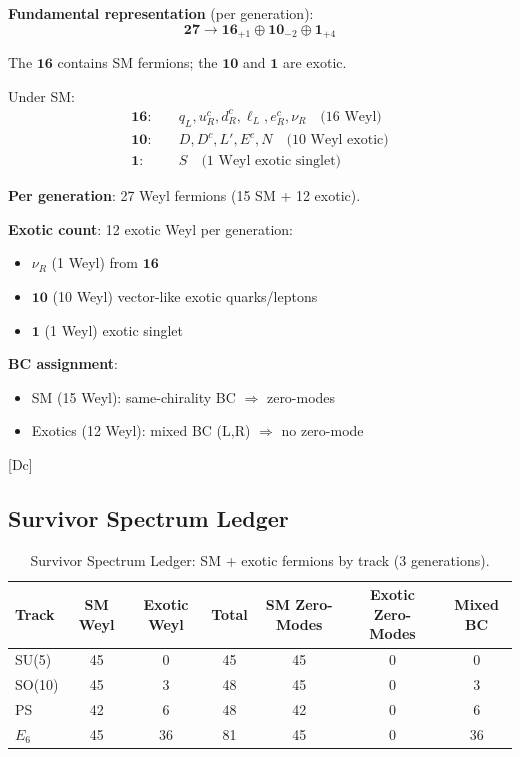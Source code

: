 \documentclass[11pt,a4paper]{article}
\newcommand{\tagDc}{\textcolor{blue!50!black}{[Dc]}}
\begin{document}
\begin{trackbox}
\textbf{Fundamental representation} (per generation):
\begin{equation}
\label{eq:e6-27}
\mathbf{27} \to \mathbf{16}_{+1} \oplus \mathbf{10}_{-2} \oplus \mathbf{1}_{+4}
\end{equation}

The $\mathbf{16}$ contains SM fermions; the $\mathbf{10}$ and $\mathbf{1}$ are exotic.

Under SM:
\begin{align}
\label{eq:e6-16-content}
\mathbf{16}: \quad & q_L, u_R^c, d_R^c, \ell_L, e_R^c, \nu_R \quad \text{(16 Weyl)} \\
\label{eq:e6-10-content}
\mathbf{10}: \quad & D, D^c, L', E^c, N \quad \text{(10 Weyl exotic)} \\
\label{eq:e6-1-content}
\mathbf{1}: \quad & S \quad \text{(1 Weyl exotic singlet)}
\end{align}

\textbf{Per generation}: 27 Weyl fermions (15 SM + 12 exotic).

\textbf{Exotic count}: 12 exotic Weyl per generation:
\begin{itemize}
    \item $\nu_R$ (1 Weyl) from $\mathbf{16}$
    \item $\mathbf{10}$ (10 Weyl) vector-like exotic quarks/leptons
    \item $\mathbf{1}$ (1 Weyl) exotic singlet
\end{itemize}

\textbf{BC assignment}:
\begin{itemize}
    \item SM (15 Weyl): same-chirality BC $\Rightarrow$ zero-modes
    \item Exotics (12 Weyl): mixed BC (L,R) $\Rightarrow$ no zero-mode
\end{itemize}
\tagDc
\end{trackbox}

\subsection{Survivor Spectrum Ledger}

\begin{table}[h]
\centering
\caption{Survivor Spectrum Ledger: SM + exotic fermions by track (3 generations).}
\label{tab:survivor-ledger}
\begin{tabular}{lcccccc}
\toprule
Track & SM Weyl & Exotic Weyl & Total & SM Zero-Modes & Exotic Zero-Modes & Mixed BC \\
\midrule
SU(5) & 45 & 0 & 45 & 45 & 0 & 0 \\
SO(10) & 45 & 3 & 48 & 45 & 0 & 3 \\
PS & 42 & 6 & 48 & 42 & 0 & 6 \\
$E_6$ & 45 & 36 & 81 & 45 & 0 & 36 \\
\bottomrule
\end{tabular}
\end{table}
\end{document}
